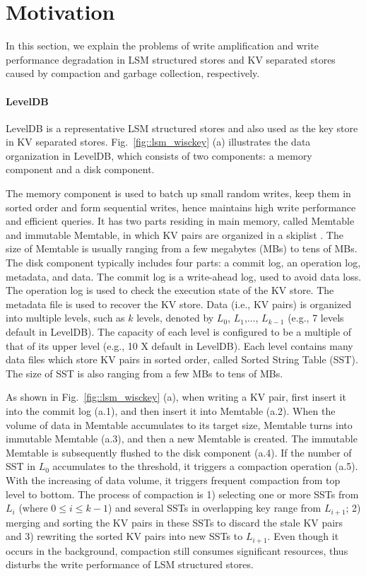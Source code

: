 \documentclass[sigconf]{acmart}
\begin{document}
\section{Motivation}
In this section, we explain the problems of write amplification and write performance degradation in LSM structured stores and KV separated stores caused by compaction and garbage collection, respectively.

\paragraph{LevelDB} LevelDB \cite{LevelDB} is a representative LSM structured stores and also used as the key store in KV separated stores. Fig.~\ref{fig::lsm_wisckey} (a) illustrates the data organization in LevelDB, which consists of two components: a memory component and a disk component. 

The memory component is used to batch up small random writes, keep them in sorted order and form sequential writes, hence maintains high write performance and efficient queries. It has two parts residing in main memory, called Memtable and immutable Memtable, in which KV pairs are organized in a skiplist \cite{skiplist}. The size of Memtable is usually ranging from a few megabytes (MBs) to tens of MBs. The disk component typically includes four parts: a commit log, an operation log, metadata, and data. The commit log is a write-ahead log, used to avoid data loss. The operation log is used to check the execution state of the KV store. The metadata file is used to recover the KV store. Data (i.e., KV pairs) is organized into multiple levels, such as $k$ levels, denoted by $L_0$, $L_1$,$\ldots$, $L_{k-1}$ (e.g., 7 levels default in LevelDB). The capacity of each level is configured to be a multiple of that of its upper level (e.g., 10 X default in LevelDB). Each level contains many data files which store KV pairs in sorted order, called Sorted String Table (SST). The size of SST is also ranging from a few MBs to tens of MBs.

As shown in Fig.~\ref{fig::lsm_wisckey} (a), when writing a KV pair, first insert it into the commit log (a.1), and then insert it into Memtable (a.2). When the volume of data in Memtable accumulates to its target size, Memtable turns into immutable Memtable (a.3), and then a new Memtable is created. The immutable Memtable is subsequently flushed to the disk component (a.4). If the number of SST in $L_0$ accumulates to the threshold, it triggers a compaction operation (a.5). With the increasing of data volume, it triggers frequent compaction from top level to bottom. The process of compaction is 1) selecting one or more SSTs from $L_i$ (where 0$\le$$i$$\le$$k-1$)  and several SSTs in overlapping key range from $L_{i+1}$; 2) merging and sorting the KV pairs in these SSTs to discard the stale KV pairs and 3) rewriting the sorted KV pairs into new SSTs to $L_{i+1}$. Even though it occurs in the background, compaction still consumes significant resources, thus disturbs the write performance of LSM structured stores.
\end{document}
